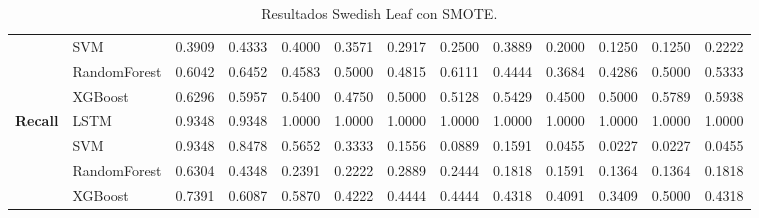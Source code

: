 \begin{table}[h]
\begin{adjustbox}{max width=15cm}
\begin{tabular}{|c|l|r|r|r|r|r|r|r|r|r|r|r|}
		& SVM &  0.3909 &  0.4333 &  0.4000 &  0.3571 &  0.2917 &  0.2500 &  0.3889 &  0.2000 &  0.1250 &  0.1250 &  0.2222 \\
		& RandomForest &  0.6042 &  0.6452 &  0.4583 &  0.5000 &  0.4815 &  0.6111 &  0.4444 &  0.3684 &  0.4286 &  0.5000 &  0.5333 \\
		& XGBoost &  0.6296 &  0.5957 &  0.5400 &  0.4750 &  0.5000 &  0.5128 &  0.5429 &  0.4500 &  0.5000 &  0.5789 &  0.5938 \\
		\hline
		\textbf{Recall} & LSTM &  0.9348 &  0.9348 &  1.0000 &  1.0000 &  1.0000 &  1.0000 &  1.0000 &  1.0000 &  1.0000 &  1.0000 &  1.0000 \\
		& SVM &  0.9348 &  0.8478 &  0.5652 &  0.3333 &  0.1556 &  0.0889 &  0.1591 &  0.0455 &  0.0227 &  0.0227 &  0.0455 \\
		& RandomForest &  0.6304 &  0.4348 &  0.2391 &  0.2222 &  0.2889 &  0.2444 &  0.1818 &  0.1591 &  0.1364 &  0.1364 &  0.1818 \\
		& XGBoost &  0.7391 &  0.6087 &  0.5870 &  0.4222 &  0.4444 &  0.4444 &  0.4318 &  0.4091 &  0.3409 &  0.5000 &  0.4318 \\
		\hline
	\end{tabular}
\end{adjustbox}
\caption{Resultados Swedish Leaf con SMOTE.}
\label{tab:SLeaf_SMOTE}
\end{table}

